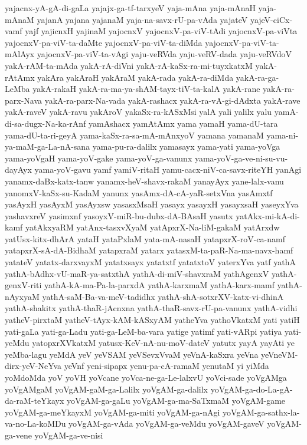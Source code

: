 {yajacnx-yA-gA-di-gaLa
yajajx-ga-tf-tarxyeV
yaja-mAna
yaja-mAnaH
yaja-mAnaM
yajanA
yajana
yajanaM
yaja-na-savx-rU-pa-vAda
yajateV
yajeV-ciCx-vamf
yajf
yajicnxH
yajinaM
yajocnxV
yajocnxV-pa-viV-tAdi
yajocnxV-pa-viVta
yajocnxV-pa-viV-ta-daMte
yajocnxV-pa-viV-ta-diMda
yajocnxV-pa-viV-ta-mAlAyx
yajocnxV-pa-viV-ta-vAgi
yaju-veRVda
yaju-veRV-dada
yaju-veRVdoV
yakA-rAM-ta-mAda
yakA-rA-diVni
yakA-rA-kaSx-ra-mi-tuyxkatxM
yakA-rAtAmx
yakAra
yakAraH
yakAraM
yakA-rada
yakA-ra-diMda
yakA-ra-ga-LeMba
yakA-rakaH
yakA-ra-ma-ya-shAM-tayx-tiV-ta-kalA
yakA-rane
yakA-ra-parx-Nava
yakA-ra-parx-Na-vada
yakA-rashacx
yakA-ra-vA-gi-dAdxta
yakA-rave
yakA-raveV
yakA-ravu
yakAroV
yakaSx-ra-kASxMsi
yalA
yali
yalilx
yalu
yamA-di-sa-dugx-Na-ka-rAnf
yamAshacx
yamAtAmx
yama
yamaH
yama-dU-tara
yama-dU-ta-ri-geyA
yama-kaSx-ra-sa-mA-mAnxyoV
yamana
yamanaM
yama-ni-ya-maM-ga-La-nA-sana
yama-pu-ra-dalilx
yamasayx
yama-yati
yama-yoVga
yama-yoVgaH
yama-yoV-gake
yama-yoV-ga-vanunx
yama-yoV-ga-ve-ni-su-vu-dayAyx
yama-yoV-gavu
yamf
yamiV-ritaH
yamu-cacx-niV-ca-savx-riteYH
yanAgi
yanamx-daBx-katx-tanw
yanamx-heV-shavx-rakaM
yanayAyx
yane-lalx-vanu
yanomxV-kaSx-su-KadaM
yanunx
yasAmx-dA-cA-yaR-setxVna
yasAmxtf
yasAyxH
yasAyxM
yasAyxsw
yasasxMsaH
yasayx
yasayxH
yasayxsaH
yaseyxYva
yashavxreV
yasimxnf
yasoyxV-miR-bu-dubx-dA-BAsaH
yasutx
yatAkx-mi-kA-di-kamf
yatAkxyaRM
yatAnx-tasxvXyaM
yatApxrX-Na-liM-gakaM
yatArxdw
yatUsx-kitx-dhArA
yataH
yataPxlaM
yata-mA-nasaH
yatapxrX-roV-ca-namf
yatapxrX-sA-dA-BidhaM
yatapxraM
yatarx
yatasxM-ta-paR-Na-ma-navx-hamf
yatateV
yatatx-darxvayxM
yatatxsayx
yatatxtf
yatatxtoV
yaterxYva
yatf
yathA
yathA-bAdhx-vU-maR-ya-satxthA
yathA-di-miV-shavxraM
yathAgenxV
yathA-genxV-riti
yathA-kA-ma-Pa-la-parxdA
yathA-karxmaM
yathA-karx-mamf
yathA-nAyxyaM
yathA-saM-Ba-va-meV-tadidhx
yathA-shA-sotxrXV-katx-vi-dhinA
yathA-shakitx
yathA-thaR-jAcnxna
yathA-thaR-savx-rU-pa-vanunx
yathA-vidhi
yatheV-pirxtaM
yatheV-tAyx-kAM-kASxyAM
yatheYva
yathoVkatxM
yati
yatiH
yati-gaLa
yati-ga-Ladu
yati-ga-LeM-ba-vara
yatige
yatimf
yati-vARpi
yatiya
yati-yeMdu
yatopxrXVkatxM
yatusx-KeV-nA-nu-moV-dateV
yatutx
yayA
yayAti
ye
yeMba-lagu
yeMdA
yeV
yeVSAM
yeVSevxVvaM
yeVnA-kaSxra
yeVna
yeVneVM-dirx-yeV-NeYva
yeVnf
yeni-sipapx
yenu-pa-cA-ramaM
yenutaM
yi
yiMda
yoMdoMda
yoV
yoVH
yoVcane
yoVca-ne-ga-Le-lalxvU
yoVci-sade
yoVgAMga
yoVgAMgaM
yoVgAM-gaM-ga-Lalilx
yoVgAM-ga-dalilx
yoVgAM-ga-do-La-gA-da-raM-teYkayx
yoVgAM-ga-gaLu
yoVgAM-ga-ma-SaTxmaM
yoVgAM-game
yoVgAM-ga-meYkayxM
yoVgAM-ga-miti
yoVgAM-ga-nAgi
yoVgAM-ga-sathx-la-va-no-La-koMDu
yoVgAM-ga-vAda
yoVgAM-ga-veMdu
yoVgAM-gaveV
yoVgAM-ga-vene
yoVgAM-ga-ve-nisi
}
